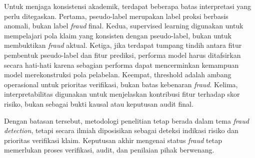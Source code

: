 Untuk menjaga konsistensi akademik, terdapat beberapa batas interpretasi yang perlu ditegaskan. Pertama, pseudo-label merupakan label proksi berbasis anomali, bukan label \emph{fraud} final. Kedua, supervised learning digunakan untuk mempelajari pola klaim yang konsisten dengan pseudo-label, bukan untuk membuktikan \emph{fraud} aktual. Ketiga, jika terdapat tumpang tindih antara fitur pembentuk pseudo-label dan fitur prediksi, performa model harus ditafsirkan secara hati-hati karena sebagian performa dapat mencerminkan kemampuan model merekonstruksi pola pelabelan. Keempat, threshold adalah ambang operasional untuk prioritas verifikasi, bukan batas kebenaran \emph{fraud}. Kelima, interpretabilitas digunakan untuk menjelaskan kontribusi fitur terhadap skor risiko, bukan sebagai bukti kausal atau keputusan audit final.

Dengan batasan tersebut, metodologi penelitian tetap berada dalam tema \emph{fraud detection}, tetapi secara ilmiah diposisikan sebagai deteksi indikasi risiko dan prioritas verifikasi klaim. Keputusan akhir mengenai status \emph{fraud} tetap memerlukan proses verifikasi, audit, dan penilaian pihak berwenang.
